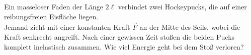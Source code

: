 \begin{minipage}[b]{0.8\textwidth}
\begin{Exercise}[title = Zwei Pucks, origin = {David Morin - Classical Mechanics}, difficulty = 3, label = pucks]
Ein masseloser Faden der Länge $2\ell$ verbindet zwei Hockeypucks, die auf einer reibungsfreien Eisfläche liegen.\\
Jemand zieht mit einer konstanten Kraft $\vec{F}$ an der Mitte des Seils, wobei die Kraft senkrecht angreift.
Nach einer gewissen Zeit stoßen die beiden Pucks komplett inelastisch zusammen. Wie viel Energie geht bei dem Stoß verloren?
\end{Exercise}
\end{minipage}
\hfill
\begin{minipage}[b]{.2\textwidth}
\centering
{}
\end{minipage}
